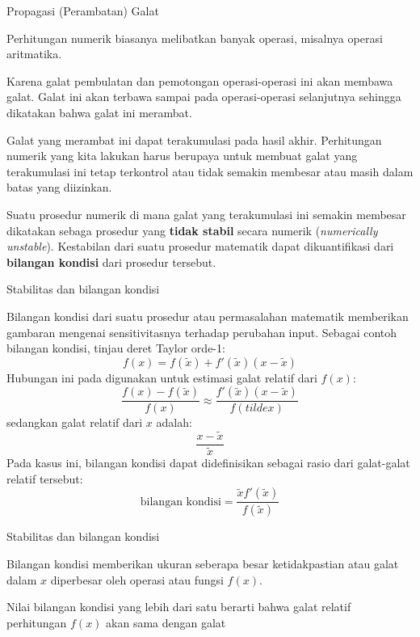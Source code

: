 \begin{frame}{Propagasi (Perambatan) Galat}

Perhitungan numerik biasanya melibatkan banyak operasi, misalnya operasi aritmatika.

Karena galat pembulatan dan pemotongan operasi-operasi ini akan membawa galat.
Galat ini akan terbawa sampai pada operasi-operasi selanjutnya sehingga dikatakan
bahwa galat ini merambat.

Galat yang merambat ini dapat terakumulasi pada hasil akhir.
Perhitungan numerik yang kita lakukan harus berupaya untuk membuat
galat yang terakumulasi ini tetap terkontrol atau tidak semakin membesar
atau masih dalam batas yang diizinkan.

Suatu prosedur numerik di mana galat yang terakumulasi ini semakin
membesar dikatakan sebaga prosedur yang \textbf{tidak stabil} secara numerik
(\textit{numerically unstable}). Kestabilan dari suatu prosedur
matematik dapat dikuantifikasi dari \textbf{bilangan kondisi} dari prosedur tersebut.

\end{frame}



\begin{frame}{Stabilitas dan bilangan kondisi}
\fontsize{9}{10}\selectfont

Bilangan kondisi dari suatu prosedur atau permasalahan matematik memberikan
gambaran mengenai sensitivitasnya terhadap perubahan input.
Sebagai contoh bilangan kondisi, tinjau deret Taylor orde-1:
$$
f(x) = f(\tilde{x}) + f'(\tilde{x})(x - \tilde{x})
$$
Hubungan ini pada digunakan untuk estimasi galat relatif dari $f(x)$:
$$
\frac{f(x) - f(\tilde{x})}{f(x)} \approx \frac{f'(\tilde{x})(x - \tilde{x})}{f(tilde{x})}
$$
sedangkan galat relatif dari $x$ adalah:
$$
\frac{x - \tilde{x}}{\tilde{x}}
$$
Pada kasus ini, bilangan kondisi dapat didefinisikan sebagai rasio dari galat-galat
relatif tersebut:
$$
\text{bilangan kondisi} = \frac{\tilde{x}f'(\tilde{x})}{f(\tilde{x})}
$$
\end{frame}


\begin{frame}{Stabilitas dan bilangan kondisi}

Bilangan kondisi memberikan ukuran seberapa besar ketidakpastian atau galat dalam
$x$ diperbesar oleh operasi atau fungsi $f(x)$.

Nilai bilangan kondisi yang lebih dari satu berarti bahwa galat relatif
perhitungan $f(x)$ akan sama dengan
galat

\end{frame}



